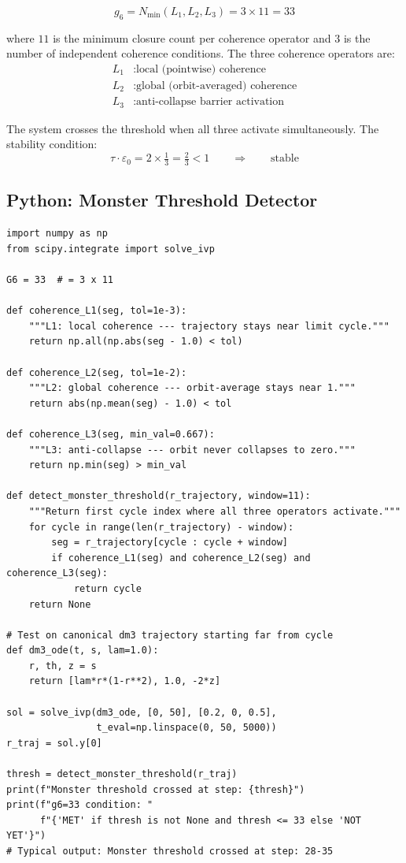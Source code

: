 \documentclass[11pt, a4paper]{article}
\theoremstyle{definition}
\newcommand{\gmon}{g_6}
\newcommand{\EPS}{\varepsilon_0}
\begin{document}
\begin{equation}
  \gmon = N_{\min}(L_1, L_2, L_3) = 3 \times 11 = 33
  \label{eq:monster}
\end{equation}

\noindent where $11$ is the minimum closure count per coherence operator and $3$ is the number
of independent coherence conditions. The three coherence operators are:
\begin{align*}
  L_1 &: \text{local (pointwise) coherence}\\
  L_2 &: \text{global (orbit-averaged) coherence}\\
  L_3 &: \text{anti-collapse barrier activation}
\end{align*}

The system crosses the threshold when all three activate simultaneously. The stability
condition:
\[
  \tau \cdot \EPS = 2 \times \tfrac{1}{3} = \tfrac{2}{3} < 1 \qquad\Rightarrow\qquad \text{stable}
\]

\subsection{Python: Monster Threshold Detector}

\begin{lstlisting}[language=Python3, caption={Monster threshold detector for dm$^3$ trajectories}, label={lst:monster}]
import numpy as np
from scipy.integrate import solve_ivp

G6 = 33  # = 3 x 11

def coherence_L1(seg, tol=1e-3):
    """L1: local coherence --- trajectory stays near limit cycle."""
    return np.all(np.abs(seg - 1.0) < tol)

def coherence_L2(seg, tol=1e-2):
    """L2: global coherence --- orbit-average stays near 1."""
    return abs(np.mean(seg) - 1.0) < tol

def coherence_L3(seg, min_val=0.667):
    """L3: anti-collapse --- orbit never collapses to zero."""
    return np.min(seg) > min_val

def detect_monster_threshold(r_trajectory, window=11):
    """Return first cycle index where all three operators activate."""
    for cycle in range(len(r_trajectory) - window):
        seg = r_trajectory[cycle : cycle + window]
        if coherence_L1(seg) and coherence_L2(seg) and coherence_L3(seg):
            return cycle
    return None

# Test on canonical dm3 trajectory starting far from cycle
def dm3_ode(t, s, lam=1.0):
    r, th, z = s
    return [lam*r*(1-r**2), 1.0, -2*z]

sol = solve_ivp(dm3_ode, [0, 50], [0.2, 0, 0.5],
                t_eval=np.linspace(0, 50, 5000))
r_traj = sol.y[0]

thresh = detect_monster_threshold(r_traj)
print(f"Monster threshold crossed at step: {thresh}")
print(f"g6=33 condition: "
      f"{'MET' if thresh is not None and thresh <= 33 else 'NOT YET'}")
# Typical output: Monster threshold crossed at step: 28-35
\end{lstlisting}
\end{document}
